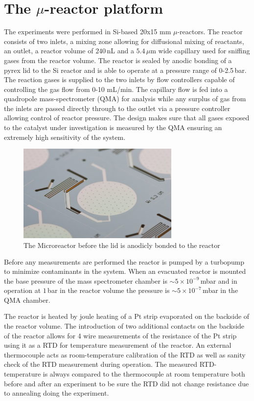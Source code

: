 \documentclass[8.5pt,twoside,twocolumn]{article}
\begin{document}
\section{The $\mu$-reactor platform}
The experiments were performed in Si-based 20x15 mm $\mu$-reactors\cite{Henriksen2009}. The reactor consists of two inlets, a mixing zone allowing for diffusional mixing of reactants, an outlet, a reactor volume of $240\,$nL and a $5.4\,\mu$m wide capillary used for sniffing gases from the reactor volume. The reactor is sealed by anodic bonding of a pyrex lid to the Si reactor and is able to operate at a pressure range of 0-2.5\,bar. The reaction gases is supplied to the two inlets by flow controllers capable of controlling the gas flow from 0-10 mL/min. The capillary flow is fed into a quadropole mass-spectrometer (QMA) for analysis while any surplus of gas from the inlets are passed directly through to the outlet via a pressure controller allowing control of reactor pressure. The design makes sure that all gases exposed to the catalyst under investigation is measured by the QMA ensuring an extremely high sensitivity of the system. 

\begin{figure}[h]
  \centering
  \includegraphics[width=8cm]{reactor.jpg}
  \caption{The Microreactor before the lid is anodicly bonded to the reactor}
  \label{fgr:reactor}
\end{figure}


Before any measurements are performed the reactor is pumped by a turbopump to minimize contaminants in the system. When an evacuated reactor is mounted the base pressure of the mass spectrometer chamber is $\sim5\times10^{-9}\,$mbar and in operation at $1\,$bar in the reactor volume the pressure is $\sim5\times10^{-7}\,$mbar in the QMA chamber. 

The reactor is heated by joule heating of a Pt strip evaporated on the backside of the reactor volume. The introduction of two additional contacts on the backside of the reactor allows for 4 wire measurements of the resistance of the Pt strip using it as a RTD for temperature measurement of the reactor. An external thermocouple acts as room-temperature calibration of the RTD as well as sanity check of the RTD measurement during operation. The measured RTD-temperature is always compared to the thermocouple at room temperature both before and after an experiment to be sure the RTD did not change resistance due to annealing doing the experiment.
\end{document}
